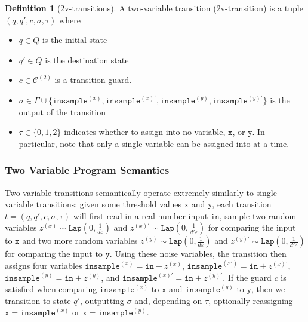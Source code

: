 \documentclass[12pt]{article}
\newcommand{\Lap}{\texttt{Lap}}
\theoremstyle{definition}
\newtheorem{defn}[thm]{Definition}
\begin{document}
\begin{defn}[2v-transitions]
    A two-variable transition (2v-transition) is a tuple $(q, q', c, \sigma, \tau)$ where \begin{itemize}
        \item $q\in Q$ is the initial state
        \item $q'\in Q$ is the destination state
        \item $c\in\mathcal{C}^{(2)}$ is a transition guard.
        \item $\sigma\in\Gamma\cup\{\texttt{insample}^{(x)}, \texttt{insample}^{(x)\prime}, \texttt{insample}^{(y)}, \texttt{insample}^{(y)\prime}\}$ is the output of the transition
        \item $\tau \in \{0, 1, 2\}$ indicates whether to assign into no variable, $\texttt{x}$, or $\texttt{y}$. In particular, note that only a single variable can be assigned into at a time. 
    \end{itemize}
\end{defn}

\subsubsection{Two Variable Program Semantics}

Two variable transitions semantically operate extremely similarly to single variable transitions: given some threshold values $\texttt{x}$ and $\texttt{y}$, each transition $t = (q, q', c, \sigma, \tau)$ will first read in a real number input $\texttt{in}$, 
sample two random variables $z^{(x)}\sim\Lap(0, \frac{1}{d\varepsilon})$ and $z^{(x)\prime}\sim\Lap(0, \frac{1}{d'\varepsilon})$ for comparing the input to $\texttt{x}$ and two more random variables $z^{(y)}\sim\Lap(0, \frac{1}{d\varepsilon})$ and $z^{(y)\prime}\sim\Lap(0, \frac{1}{d'\varepsilon})$ for comparing the input to $\texttt{y}$.
Using these noise variables, the transition then assigns four variables $\texttt{insample}^{(x)} = \texttt{in} + z^{(x)}$, $\texttt{insample}^{(x\prime)} = \texttt{in} + z^{(x)\prime}$, $\texttt{insample}^{(y)} = \texttt{in} + z^{(y)}$, and $\texttt{insample}^{(x)\prime} = \texttt{in} + z^{(y)\prime}$. 
If the guard $c$ is satisfied when comparing $\texttt{insample}^{(x)}$ to $\texttt{x}$ and $\texttt{insample}^{(y)}$ to $\texttt{y}$, then we transition to state $q'$, outputting $\sigma$ and, depending on $\tau$, optionally reassigning $\texttt{x} = \texttt{insample}^{(x)}$ or $\texttt{x} = \texttt{insample}^{(y)}$.
\end{document}
